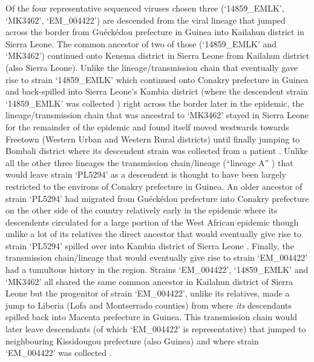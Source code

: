 \documentclass{bmcart}
\begin{document}
Of the four representative sequenced viruses chosen three (`14859\_EMLK', `MK3462', `EM\_004422') are descended from the viral lineage that jumped across the border from Gu\'{e}ck\'{e}dou prefecture in Guinea into Kailahun district in Sierra Leone.
The common ancestor of two of those (`14859\_EMLK' and `MK3462') continued onto Kenema district in Sierra Leone from Kailahun district (also Sierra Leone).
Unlike the lineage/transmission chain that eventually gave rise to strain `14859\_EMLK' which continued onto Conakry prefecture in Guinea and back-spilled into Sierra Leone's Kambia district (where the descendent strain `14859\_EMLK' was collected \cite{arias_rapid_2016}) right across the border later in the epidemic, the lineage/transmission chain that was ancestral to `MK3462' stayed in Sierra Leone for the remainder of the epidemic and found itself moved westwards towards Freetown (Western Urban and Western Rural districts) until finally jumping to Bombali district where its descendent strain was collected from a patient \cite{arias_rapid_2016}.
Unlike all the other three lineages the transmission chain/lineage (``lineage A'' \cite{carroll_temporal_2015}) that would leave strain `PL5294' as a descendent is thought to have been largely restricted to the environs of Conakry prefecture in Guinea.
An older ancestor of strain `PL5294' had migrated from Gu\'{e}ck\'{e}dou prefecture into Conakry prefecture on the other side of the country relatively early in the epidemic where its descendents circulated for a large portion of the West African epidemic though unlike a lot of its relatives the direct ancestor that would eventually give rise to strain `PL5294' spilled over into Kambia district of Sierra Leone \cite{arias_rapid_2016}.
Finally, the transmission chain/lineage that would eventually give rise to strain `EM\_004422' had a tumultous history in the region.
Strains `EM\_004422', `14859\_EMLK' and `MK3462' all shared the same common ancestor in Kailahun district of Sierra Leone but the progenitor of strain `EM\_004422', unlike its relatives, made a jump to Liberia (Lofa and Montserrado counties) from where \textit{its} descendants spilled back into Macenta prefecture in Guinea.
This transmission chain would later leave descendants (of which `EM\_004422' is representative) that jumped to neighbouring Kissidougou prefecture (also Guinea) and where strain `EM\_004422' was collected \cite{carroll_temporal_2015}.
\end{document}
